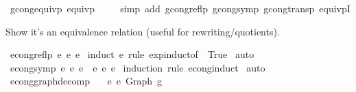 \begin{isabellebody}
\isamarkupfalse%
\ gcong{\isacharunderscore}{\kern0pt}equivp{\isacharcolon}{\kern0pt}\ {\isachardoublequoteopen}equivp\ {\isacharparenleft}{\kern0pt}{\isasymsimeq}{\isacharparenright}{\kern0pt}{\isachardoublequoteclose}\isanewline
%
\isadelimproof
\ \ %
\endisadelimproof
%
\isatagproof
{}\isamarkupfalse%
\ {\isacharparenleft}{\kern0pt}simp\ add{\isacharcolon}{\kern0pt}\ gcong{\isacharunderscore}{\kern0pt}reflp\ gcong{\isacharunderscore}{\kern0pt}symp\ gcong{\isacharunderscore}{\kern0pt}transp\ equivpI{\isacharparenright}{\kern0pt}%
\endisatagproof
{\isafoldproof}%
%
\isadelimproof
%
\endisadelimproof
%
\begin{isamarkuptext}%
Show it's an equivalence relation (useful for rewriting/quotients).%
\end{isamarkuptext}\isamarkuptrue%
\isamarkupfalse%
\ econg{\isacharunderscore}{\kern0pt}reflp{\isacharcolon}{\kern0pt}\ {\isachardoublequoteopen}e\ {\isasymsimeq}e\ e{\isachardoublequoteclose}\isanewline
%
\isadelimproof
%
\endisadelimproof
%
\isatagproof
{}\isamarkupfalse%
\ {\isacharparenleft}{\kern0pt}induct\ e\ rule{\isacharcolon}{\kern0pt}\ exp{\isachardot}{\kern0pt}induct{\isacharbrackleft}{\kern0pt}of\ {\isachardoublequoteopen}{\isacharpercent}{\kern0pt}{\isacharunderscore}{\kern0pt}{\isachardot}{\kern0pt}\ True{\isachardoublequoteclose}{\isacharbrackright}{\kern0pt}{\isacharparenright}{\kern0pt}\isanewline
{}\isamarkupfalse%
\ auto%
\endisatagproof
{\isafoldproof}%
%
\isadelimproof
\isanewline
%
\endisadelimproof
\isanewline
{}\isamarkupfalse%
\ econg{\isacharunderscore}{\kern0pt}symp{\isacharcolon}{\kern0pt}\ {\isachardoublequoteopen}e{}\ {\isasymsimeq}e\ e{}\ {\isacharequal}{\kern0pt}{\isacharequal}{\kern0pt}{\isachargreater}{\kern0pt}\ e{}\ {\isasymsimeq}e\ e{}{\isachardoublequoteclose}\isanewline
%
\isadelimproof
%
\endisadelimproof
%
\isatagproof
{}\isamarkupfalse%
\ {\isacharparenleft}{\kern0pt}induction\ rule{\isacharcolon}{\kern0pt}\ econg{\isachardot}{\kern0pt}induct{\isacharparenright}{\kern0pt}\isanewline
{}\isamarkupfalse%
\ auto%
\endisatagproof
{\isafoldproof}%
%
\isadelimproof
\isanewline
%
\endisadelimproof
\isanewline
\isanewline
\isanewline
{}\isamarkupfalse%
\ econg{\isacharunderscore}{\kern0pt}graph{\isacharunderscore}{\kern0pt}decomp{\isacharcolon}{\kern0pt}\isanewline
\ \ \ {\isachardoublequoteopen}e{\isacharprime}{\kern0pt}\ {\isasymsimeq}e\ Graph\ g{\isachardoublequoteclose}\isanewline

\end{isabellebody}
